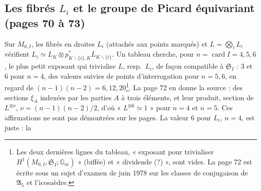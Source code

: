 \documentclass[11pt,a4paper]{article}
\begin{document}
\subsection*{Les fibrés $L_i$ et le groupe de Picard équivariant (pages 70 à
73)}

Sur $M_{0,I}$, les fibrés en droites $L_i$ (attachés aux points marqués) et
$L = \bigotimes_i L_i$ vérifient $L_i \simeq L_K \otimes p^{*}_{K
\smallsetminus\{i\}, K} L_{K \smallsetminus \{i\}}$. Un tableau cherche, pour
$n = \operatorname{card} I = 4, 5, 6$, le plus petit exposant qui trivialise
$L$, resp.\ $L_i$, de façon compatible à $\mathfrak{S}_I$ : $3$ et $6$ pour
$n = 4$, des valeurs suivies de points d'interrogation pour $n = 5, 6$, en
regard de $(n-1)(n-2) = 6, 12, 20$\footnote{Les deux dernières lignes du
tableau, « exposant pour trivialiser $H^1(M_{0,I}, \mathfrak{S}_I;
\mathbb{G}_m)$ » (biffée) et « dividende (?) », sont vides. La page 72 est
écrite sous un sujet d'examen de juin 1978 sur les classes de conjugaison de
$\mathfrak{A}_5$ et l'icosaèdre.}. La page 72 en donne la source : des
sections $\xi_A$ indexées par les parties $A$ à trois éléments, et leur
produit, section de $L^{\otimes\nu}$, $\nu = (n-1)(n-2)/2$, d'où « $L^{\otimes
6} \simeq 1$ » pour $n = 4$ et $n = 5$. Ces affirmations ne sont pas
démontrées sur les pages. La valeur $6$ pour $L_i$, $n = 4$, est juste : la
\end{document}
